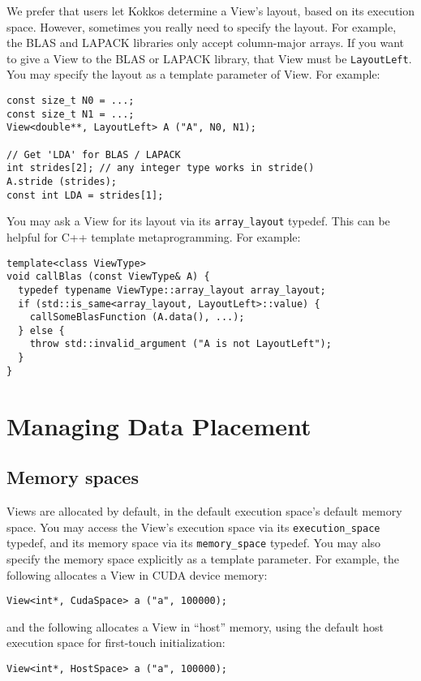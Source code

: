 We prefer that users let Kokkos determine a View's layout, based on
its execution space.  However, sometimes you really need to specify
the layout.  For example, the BLAS and LAPACK libraries only accept
column-major arrays.  If you want to give a View to the BLAS or
LAPACK library, that View must be \lstinline!LayoutLeft!.  You may specify the
layout as a template parameter of View.  For example:
\begin{lstlisting}
const size_t N0 = ...;
const size_t N1 = ...;
View<double**, LayoutLeft> A ("A", N0, N1);

// Get 'LDA' for BLAS / LAPACK
int strides[2]; // any integer type works in stride()
A.stride (strides);
const int LDA = strides[1];
\end{lstlisting}
You may ask a View for its layout via its \lstinline!array_layout! typedef.
This can be helpful for C++ template metaprogramming.  For example:
\begin{lstlisting}
template<class ViewType>
void callBlas (const ViewType& A) {
  typedef typename ViewType::array_layout array_layout;
  if (std::is_same<array_layout, LayoutLeft>::value) {
    callSomeBlasFunction (A.data(), ...);
  } else {
    throw std::invalid_argument ("A is not LayoutLeft");
  }
}
\end{lstlisting}

\section{Managing Data Placement}\label{S:View:Placement}

\subsection{Memory spaces}

Views are allocated by default, in the default execution space's
default memory space.  You may access the View's execution space via
its \lstinline!execution_space! typedef, and its memory space via its
\lstinline!memory_space! typedef.  You may also specify the memory space
explicitly as a template parameter.  For example, the following
allocates a View in CUDA device memory:
\begin{lstlisting}
View<int*, CudaSpace> a ("a", 100000);
\end{lstlisting}
and the following allocates a View in ``host'' memory, using the default 
host execution space for first-touch initialization:
\begin{lstlisting}
View<int*, HostSpace> a ("a", 100000);
\end{lstlisting}

